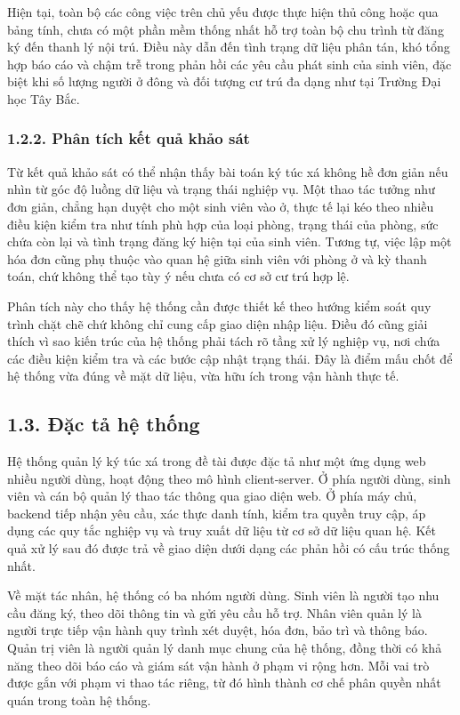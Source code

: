 \documentclass[12pt]{article}
\begin{document}
Hiện tại, toàn bộ các công việc trên chủ yếu được thực hiện thủ công hoặc qua bảng tính, chưa có một phần mềm thống nhất hỗ trợ toàn bộ chu trình từ đăng ký đến thanh lý nội trú. Điều này dẫn đến tình trạng dữ liệu phân tán, khó tổng hợp báo cáo và chậm trễ trong phản hồi các yêu cầu phát sinh của sinh viên, đặc biệt khi số lượng người ở đông và đối tượng cư trú đa dạng như tại Trường Đại học Tây Bắc.

\subsubsection*{1.2.2. Phân tích kết quả khảo sát}

Từ kết quả khảo sát có thể nhận thấy bài toán ký túc xá không hề đơn giản nếu nhìn từ góc độ luồng dữ liệu và trạng thái nghiệp vụ. Một thao tác tưởng như đơn giản, chẳng hạn duyệt cho một sinh viên vào ở, thực tế lại kéo theo nhiều điều kiện kiểm tra như tính phù hợp của loại phòng, trạng thái của phòng, sức chứa còn lại và tình trạng đăng ký hiện tại của sinh viên. Tương tự, việc lập một hóa đơn cũng phụ thuộc vào quan hệ giữa sinh viên với phòng ở và kỳ thanh toán, chứ không thể tạo tùy ý nếu chưa có cơ sở cư trú hợp lệ.

Phân tích này cho thấy hệ thống cần được thiết kế theo hướng kiểm soát quy trình chặt chẽ chứ không chỉ cung cấp giao diện nhập liệu. Điều đó cũng giải thích vì sao kiến trúc của hệ thống phải tách rõ tầng xử lý nghiệp vụ, nơi chứa các điều kiện kiểm tra và các bước cập nhật trạng thái. Đây là điểm mấu chốt để hệ thống vừa đúng về mặt dữ liệu, vừa hữu ích trong vận hành thực tế.

\subsection*{1.3. Đặc tả hệ thống}

Hệ thống quản lý ký túc xá trong đề tài được đặc tả như một ứng dụng web nhiều người dùng, hoạt động theo mô hình client-server. Ở phía người dùng, sinh viên và cán bộ quản lý thao tác thông qua giao diện web. Ở phía máy chủ, backend tiếp nhận yêu cầu, xác thực danh tính, kiểm tra quyền truy cập, áp dụng các quy tắc nghiệp vụ và truy xuất dữ liệu từ cơ sở dữ liệu quan hệ. Kết quả xử lý sau đó được trả về giao diện dưới dạng các phản hồi có cấu trúc thống nhất.

Về mặt tác nhân, hệ thống có ba nhóm người dùng. Sinh viên là người tạo nhu cầu đăng ký, theo dõi thông tin và gửi yêu cầu hỗ trợ. Nhân viên quản lý là người trực tiếp vận hành quy trình xét duyệt, hóa đơn, bảo trì và thông báo. Quản trị viên là người quản lý danh mục chung của hệ thống, đồng thời có khả năng theo dõi báo cáo và giám sát vận hành ở phạm vi rộng hơn. Mỗi vai trò được gắn với phạm vi thao tác riêng, từ đó hình thành cơ chế phân quyền nhất quán trong toàn hệ thống.
\end{document}
